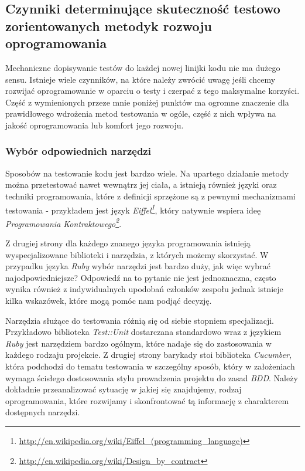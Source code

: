   \subsection{Czynniki determinujące skuteczność testowo zorientowanych metodyk rozwoju oprogramowania}
  Mechaniczne dopisywanie testów do każdej nowej linijki kodu nie ma dużego sensu. Istnieje wiele czynników, na które należy zwrócić uwagę jeśli chcemy rozwijać oprogramowanie w oparciu o testy i czerpać z tego maksymalne korzyści. Część z wymienionych przeze mnie poniżej punktów ma ogromne znaczenie dla prawidłowego wdrożenia metod testowania w ogóle, część z nich wpływa na jakość oprogramowania lub komfort jego rozwoju.
  
  \subsubsection{Wybór odpowiednich narzędzi}
  Sposobów na testowanie kodu jest bardzo wiele. Na upartego działanie metody można przetestować nawet wewnątrz jej ciała, a istnieją również języki oraz techniki programowania, które z definicji sprzężone są z pewnymi mechanizmami testowania - przykładem jest język \emph{Eiffel\footnote{\url{http://en.wikipedia.org/wiki/Eiffel_(programming_language)}}}, który natywnie wspiera ideę \emph{Programowania Kontraktowego\footnote{\url{http://en.wikipedia.org/wiki/Design_by_contract}}}.
  
  Z drugiej strony dla każdego znanego języka programowania istnieją wyspecjalizowane biblioteki i narzędzia, z których możemy skorzystać. W przypadku języka \emph{Ruby} wybór narzędzi jest bardzo duży, jak więc wybrać najodpowiedniejsze? Odpowiedź na to pytanie nie jest jednoznaczna, często wynika również z indywidualnych upodobań członków zespołu jednak istnieje kilka wskazówek, które mogą pomóc nam podjąć decyzję.
  
  Narzędzia służące do testowania różnią się od siebie stopniem specjalizacji. Przykładowo biblioteka \emph{Test::Unit} dostarczana standardowo wraz z językiem \emph{Ruby} jest narzędziem bardzo ogólnym, które nadaje się do zastosowania w każdego rodzaju projekcie. Z drugiej strony barykady stoi biblioteka \emph{Cucumber}, która podchodzi do tematu testowania w szczególny sposób, który w założeniach wymaga ścisłego dostosowania stylu prowadzenia projektu do zasad \emph{BDD}. Należy dokładnie przeanalizować sytuację w jakiej się znajdujemy, rodzaj oprogramowania, które rozwijamy i skonfrontować tą informację z charakterem dostępnych narzędzi. 
  
